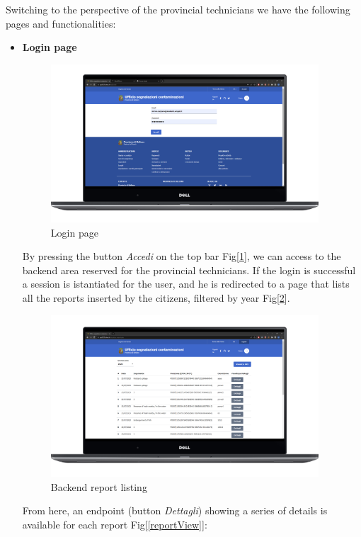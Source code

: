 \pagebreak
Switching to the perspective of the provincial technicians we have the following pages and functionalities:
\begin{itemize}
    \item \textbf{Login page} \\
    \begin{figure}[H]\centering \includegraphics[width=27em]{img/login.png} \caption{Login page} \label{login} \end{figure}
    By pressing the button \textit{Accedi} on the top bar Fig[\ref{login}], we can access to the backend area reserved for the provincial technicians.
    If the login is successful a session is istantiated for the user, and he is redirected to a page that lists all the reports inserted by the citizens, filtered by year Fig[\ref{backendListing}].
    \begin{figure}[H] \centering \includegraphics[width=27em]{img/home_back.png} \caption{Backend report listing} \label{backendListing}\end{figure}
    From here, an endpoint (button \textit{Dettagli}) showing a series of details is available for each report Fig[\ref{reportView}]:

\end{itemize}
